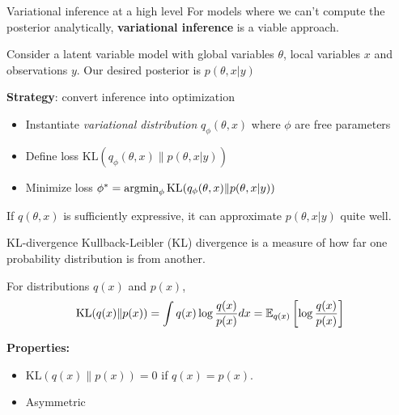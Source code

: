 \documentclass[10pt, compress]{beamer}
\begin{document}
\begin{frame}{Variational inference at a high level}
  For models where we can't compute
  the posterior analytically, \textbf{variational inference}
  is a viable approach.

  \pause
    Consider a latent variable model with global variables
    $\theta$, local variables $x$ and observations $y$. Our desired
    posterior is $p(\theta, x | y)$

    \pause
    \textbf{Strategy}: convert inference into optimization
    \begin{itemize}
        \pause
      \item Instantiate \emph{variational distribution} $q_\phi(\theta, x)$
        where $\phi$ are free parameters
        \pause
      \item Define loss $\textrm{KL}(q_\phi(\theta, x)\|p(\theta, x | y))$
        \pause
      \item Minimize loss $\phi^* = \operatorname*{argmin}_\phi \textrm{KL}(q_\phi(\theta, x)\|p(\theta, x | y))$
    \end{itemize}
    \pause
    If $q(\theta, x)$ is sufficiently expressive,
    it can approximate $p(\theta, x | y)$ quite well.
\end{frame}

\begin{frame}{KL-divergence}
  Kullback-Leibler (KL) divergence
  is a measure of how far one probability distribution
  is from another.

  \pause
  For distributions $q(x)$ and $p(x)$,
  \begin{align*}
    \textrm{KL}(q(x)\|p(x)) = \int q(x)\log \frac{q(x)}{p(x)}dx = \mathbb{E}_{q(x)}\left[\log\frac{q(x)}{p(x)}\right]
  \end{align*}

  \pause
  \textbf{Properties:}
  \begin{itemize}
    \item $\textrm{KL}(q(x)\|p(x)) = 0$ if $q(x) = p(x)$.
    \item Asymmetric
  \end{itemize}

\end{frame}
\end{document}
